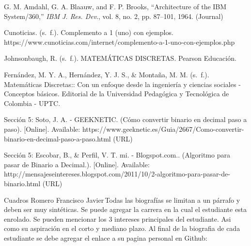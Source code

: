 \documentclass{IEEEcsmag}
\begin{document}
\def\refname{REFERENCES}

\begin{thebibliography}{1}

G. M. Amdahl, G. A. Blaauw, and F. P. Brooks, ``Architecture of the IBM System/360,'' {\it IBM J. Res. Dev}., vol. 8, no. 2, pp. 87--101, 1964. (Journal)

Cunoticias. (s. f.). Complemento a 1 (uno) con ejemplos. https://www.cunoticias.com/internet/complemento-a-1-uno-con-ejemplos.php

Johnsonbaugh, R. (s. f.). MATEMÁTICAS DISCRETAS. Pearson Educación.

Fernández, M. Y. A., Hernández, Y. J. S., & Montaña, M. M. (s. f.). Matemáticas Discretas:: Con un enfoque desde la ingeniería y ciencias sociales - Conceptos básicos. Editorial de la Universidad Pedagógica y Tecnológica de Colombia - UPTC.

Sección 5: Soto, J. A. - GEEKNETIC. (Cómo convertir binario en decimal paso a paso). [Online]. Available: {https://www.geeknetic.es/Guia/2667/Como-convertir-binario-en-decimal-paso-a-paso.html} (URL)

Sección 5: Escobar, B., & Perfil, V. T. mi. - Blogspot.com.. (Algoritmo para pasar de Binario a Decimal.). [Online]. Available: {http://mensajeseintereses.blogspot.com/2011/10/2-algoritmo-para-pasar-de-binario.html} (URL)

\end{thebibliography}\vspace*{-8pt}


\begin{IEEEbiography}{Cuadros Romero Francisco Javier}{\,}Todas las biografías se limitan a un párrafo y deben ser muy sintéticas. Se puede agregar la carrera en la cual el estudiante esta enrolado. Se pueden mencionar los 3 intereses principales del estudiante. Asi como su aspiración en el corto y mediano plazo. Al final de la biografia de cada estudiante se debe agregar el enlace a su pagina personal en Github: 
\end{IEEEbiography}
\end{document}
